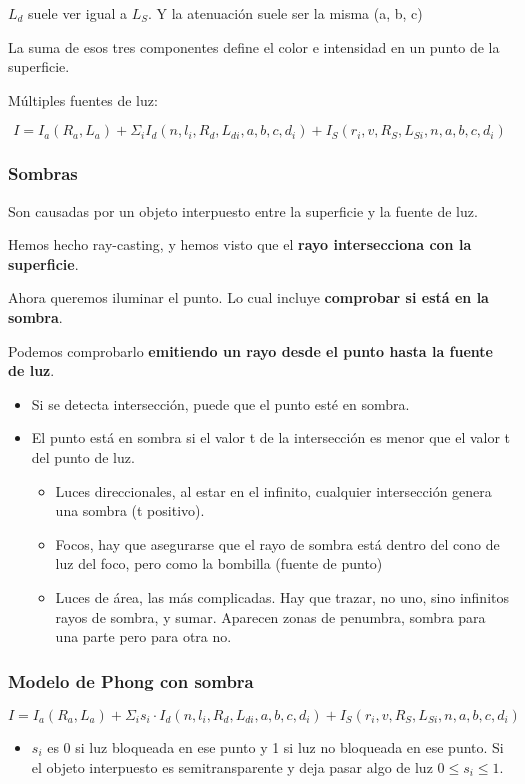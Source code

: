 $L_d$ suele ver igual a $L_S$. Y la atenuación suele ser la misma (a, b, c)

La suma de esos tres componentes define el color e intensidad en un punto de la superficie.

Múltiples fuentes de luz: 

$$I=I_a(R_a,L_a)+\Sigma_i I_d(n, l_i, R_d, L_{di}, a, b, c, d_i)+I_S(r_i,v, R_S, L_{Si}, n, a, b, c, d_i)$$
\pagebreak

\subsubsection{Sombras} 
Son causadas por un objeto interpuesto entre la superficie y la fuente de luz.

Hemos hecho ray-casting, y hemos visto que el \textbf{rayo intersecciona con la superficie}.

Ahora queremos iluminar el punto. Lo cual incluye \textbf{comprobar si está en la sombra}.

Podemos comprobarlo \textbf{emitiendo un rayo desde el punto hasta la fuente de luz}.
\begin{itemize}
    \item Si se detecta intersección, puede que el punto esté en sombra.
    \item El punto está en sombra si el valor t de la intersección es menor que el valor t del punto de luz.
    \begin{itemize}
        \item Luces direccionales, al estar en el infinito, cualquier intersección genera una sombra (t positivo).
        \item Focos, hay que asegurarse que el rayo de sombra está dentro del cono de luz del foco, pero como la bombilla (fuente de punto)
        \item Luces de área, las más complicadas. Hay que trazar, no uno, sino infinitos rayos de sombra, y sumar. Aparecen zonas de penumbra, sombra para una parte pero para otra no.
    \end{itemize}
\end{itemize}

\subsubsection{Modelo de Phong con sombra} 
$I=I_a(R_a,L_a)+\Sigma_i s_i \cdot I_d(n, l_i, R_d, L_{di}, a, b, c, d_i)+I_S(r_i,v, R_S, L_{Si}, n, a, b, c, d_i)$
\begin{itemize}
    \item $s_i$ es 0 si luz bloqueada en ese punto y 1 si luz no bloqueada en ese punto. Si el objeto interpuesto es semitransparente y deja pasar algo de luz $0 \leq s_i \leq 1$.
\end{itemize}

